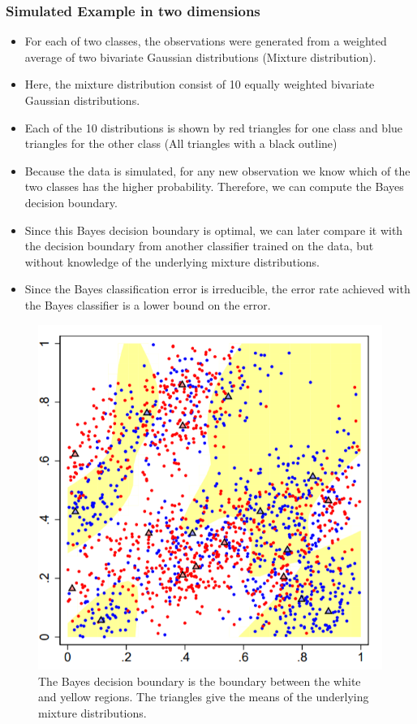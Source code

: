 \documentclass[12pt, oneside]{article}
\begin{document}
\subsubsection{Simulated Example in two dimensions}
\begin{itemize}
    \item For each of two classes, the observations were generated from a weighted average of two bivariate Gaussian distributions (Mixture distribution).
    \item Here, the mixture distribution consist of 10 equally weighted bivariate Gaussian distributions. 
    \item Each of the 10 distributions is shown by red triangles for one class and blue triangles for the other class (All triangles with a black outline)
    \item Because the data is simulated, for any new observation we know which of the two classes has the higher probability. Therefore, we can compute the Bayes decision boundary.
    \item Since this Bayes decision boundary is optimal, we can later compare it with the decision boundary from another classifier trained on the data, but without knowledge of the underlying mixture distributions.
    \item Since the Bayes classification error is irreducible, the error rate achieved with the Bayes classifier is a lower bound on the error.
\end{itemize}


\begin{figure}[!ht]
    \centering
    \includegraphics[width=\textwidth]{Bayes Classifier for two classes two x.png}        
   \caption{The Bayes decision boundary is the boundary between the white and yellow regions. The triangles give the means of the underlying mixture distributions.}
    \label{fig:my_label}
\end{figure}
\end{document}
